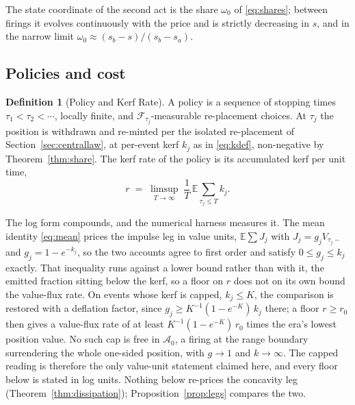 \documentclass[11pt,a4paper]{article}
\theoremstyle{definition}
\newtheorem{definition}{Definition}
\theoremstyle{plain}
\theoremstyle{remark}
\begin{document}
The state coordinate of the second act is the share $\omega_0$ of \eqref{eq:shares}; between firings it evolves continuously with the price and is strictly decreasing in $s$, and in 
the narrow limit $\omega_0 \approx (s_b - s)/(s_b - s_a)$.

\subsection{Policies and cost}\label{sec:policies}

\begin{definition}[Policy and Kerf Rate]\label{def:policy}
A policy is a sequence of stopping times $\tau_1 < \tau_2 < \cdots$, locally finite, and $\mathcal{F}_{\tau_j}$-measurable re-placement choices. At $\tau_j$ the position is withdrawn 
and re-minted per the isolated re-placement of Section~\ref{sec:centrallaw}, at per-event kerf $k_j$ as in \eqref{eq:kdef}, non-negative by Theorem~\ref{thm:share}. The kerf rate of 
the policy is its accumulated kerf per unit time,
\begin{equation}\label{eq:rdef}
r \;=\; \limsup_{T \to \infty}\; \frac{1}{T}\, \mathbb{E}
\sum_{\tau_j \le T} k_j .
\end{equation}
\end{definition}

The log form compounds, and the numerical harness measures it. The mean identity \eqref{eq:mean} prices the impulse leg in value units, $\mathbb{E}\sum J_j$ with $J_j = g_j V_{\tau_j-}$ 
and $g_j = 1 - e^{-k_j}$, so the two accounts agree to first order and satisfy $0 \le g_j \le k_j$ exactly. That inequality runs against a lower bound rather than with it, the emitted 
fraction sitting below the kerf, so a floor on $r$ does not on its own bound the value-flux rate. On events whose kerf is capped, $k_j \le K$, the comparison is restored with a deflation 
factor, since $g_j \ge K^{-1}(1 - e^{-K})\,k_j$ there; a floor $r \ge r_0$ then gives a value-flux rate of at least $K^{-1}(1 -
e^{-K})\, r_0$ times the era's lowest position value. 
No such cap is free in $\mathcal{A}_0$, a firing at the range boundary surrendering the whole one-sided position, with $g \to 1$ and $k \to \infty$. The capped reading is therefore 
the only value-unit statement claimed here, and every floor below is stated in log units. Nothing below re-prices the concavity leg (Theorem~\ref{thm:dissipation}); 
Proposition~\ref{prop:legs} compares the two.
\end{document}
